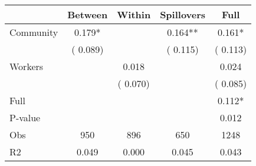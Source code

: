 
\begin{tabular}{l*{4}{c}}\hline&\multicolumn{1}{c}{Between}&\multicolumn{1}{c}{Within}&\multicolumn{1}{c}{Spillovers}&\multicolumn{1}{c}{Full}\\ \hline
 Community             &              0.179*      &                                               &        0.164** &         0.161*                            \\ 
                               &        (       0.089)           &                                       &       (       0.115)     &      (       0.113)                                           \\ 
 Workers       &                                               &        0.018    &                                &             0.024                            \\ 
                               &                                               & (       0.070)                  &                                        &      (       0.085)                                           \\ 
\hline                                                                                                                                                                                                                                            
 Full                  &                                               &                                               &                                        &             0.112*                                     \\ 
 P-value               &                                               &                                               &                                        &             0.012                                           \\ 
 Obs                   &               950               &       896                       &       650                &              1248                                               \\ 
 R2                    &                      0.049              &              0.000                      &              0.045               &                     0.043                                              \\ 
\hline \end{tabular}                                                                                                                                                                                                              